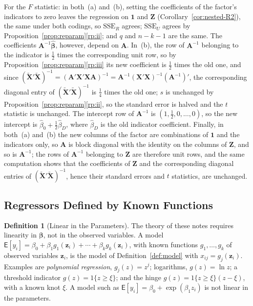 \documentclass[12pt,a4paper]{article}
\makeatletter
\theoremstyle{definition}
\newtheorem{definition}[theorem]{Definition}
\renewenvironment{proof}[1][\proofname]{\par
  \pushQED{\qed}%
  \normalfont \topsep6\p@\@plus6\p@\relax
  \trivlist
  \item[\hskip\labelsep\bfseries #1\@addpunct{.}]\ignorespaces
}{%
  \popQED\endtrivlist\@endpefalse
}
\newcommand\expc{\mathsf{E}}
\newcommand{\SSE}{\mathrm{SSE}}
\newcommand{\bX}{\mathbf{X}}
\def\bb{\boldsymbol{\beta}}
\newcommand{\bone}{\mathbf{1}}
\newcommand{\bA}{\mathbf{A}}
\makeatother
\begin{document}
\begin{proof}
For the $F$ statistic: in both~(a) and~(b), setting the coefficients of the factor's indicators to zero leaves the regression on $\bone$ and $\mathbf{Z}$ (Corollary~\ref{cor:nested-R2}), the same under both codings, so $\SSE_R$ agrees; $\SSE_U$ agrees by Proposition~\ref{prop:reparam}\ref{rp:ii}; and $q$ and $n - k - 1$ are the same. The coefficients $\bA^{-1}\hat{\bb}$, however, depend on $\bA$. In~(b), the row of $\bA^{-1}$ belonging to the indicator is $\frac{1}{2}$ times the corresponding unit row, so by Proposition~\ref{prop:reparam}\ref{rp:iii} its new coefficient is $\frac{1}{2}$ times the old one, and since $(\tilde{\bX}'\tilde{\bX})^{-1} = (\bA'\bX'\bX\bA)^{-1} = \bA^{-1}(\bX'\bX)^{-1}(\bA^{-1})'$, the corresponding diagonal entry of $(\tilde{\bX}'\tilde{\bX})^{-1}$ is $\frac{1}{4}$ times the old one; $s$ is unchanged by Proposition~\ref{prop:reparam}\ref{rp:ii}, so the standard error is halved and the $t$ statistic is unchanged. The intercept row of $\bA^{-1}$ is $(1, \frac{1}{2}, 0, \ldots, 0)$, so the new intercept is $\hat\beta_0 + \frac{1}{2}\hat\beta_D$, where $\hat\beta_D$ is the old indicator coefficient. Finally, in both~(a) and~(b) the new columns of the factor are combinations of $\bone$ and the indicators only, so $\bA$ is block diagonal with the identity on the columns of $\mathbf{Z}$, and so is $\bA^{-1}$; the rows of $\bA^{-1}$ belonging to $\mathbf{Z}$ are therefore unit rows, and the same computation shows that the coefficients of $\mathbf{Z}$ and the corresponding diagonal entries of $(\tilde{\bX}'\tilde{\bX})^{-1}$, hence their standard errors and $t$ statistics, are unchanged.
\end{proof}

\subsection{Regressors Defined by Known Functions}

\begin{definition}[Linear in the Parameters]\label{def:linear-params}
The theory of these notes requires linearity in $\bb$, not in the observed variables. A model $\expc[y_i] = \beta_0 + \beta_1g_1(\mathbf{z}_i) + \cdots + \beta_kg_k(\mathbf{z}_i)$, with known functions $g_1, \ldots, g_k$ of observed variables $\mathbf{z}_i$, is the model of Definition~\ref{def:model} with $x_{ij} = g_j(\mathbf{z}_i)$. Examples are \emph{polynomial regression}, $g_j(z) = z^j$; logarithms, $g(z) = \ln z$; a threshold indicator $g(z) = 1\{z \geqslant \xi\}$; and the hinge $g(z) = 1\{z \geqslant \xi\}(z - \xi)$, with a known knot $\xi$. A model such as $\expc[y_i] = \beta_0 + \exp(\beta_1z_i)$ is not linear in the parameters.
\end{definition}
\end{document}

